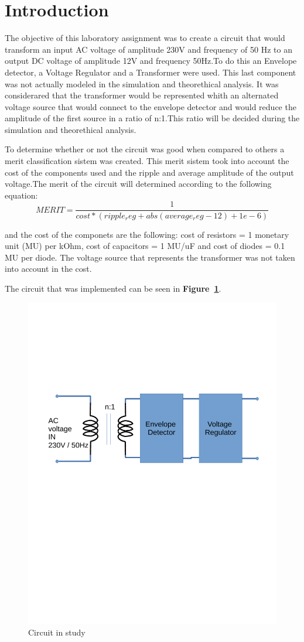 \section{Introduction}
\label{sec:introduction}


\par The objective of this laboratory assignment was to create a circuit that would transform an input AC voltage of amplitude 230V and frequency of 50 Hz to an output DC voltage of amplitude 12V and frequency 50Hz.To do this an Envelope detector, a Voltage Regulator and a Transformer were used. This last component was not actually modeled in the simulation and theorethical analysis. It was considerared that the transformer would be represented whith an alternated voltage source that would connect to the envelope detector and would reduce the amplitude of the first source in a ratio of n:1.This ratio will be decided during the simulation and theorethical analysis.\par
To determine whether or not the circuit was good when compared to others a merit classification sistem was created. This merit sistem took into account the cost of the components used and the ripple and average amplitude of the output voltage.The merit of the circuit will determined according to the following equation: 
\begin {equation}
	MERIT = \dfrac{1}{cost*(ripple_reg + abs(average_reg - 12) + 1e-6)}	
	\label{eq:i1}
\end{equation}

and the cost of the componets are the following: cost of resistors = 1 monetary unit (MU) per kOhm, cost of capacitors = 1 MU/uF
and cost of diodes = 0.1 MU per diode. The voltage source that represents the transformer was not taken into account in the cost. 
 
The circuit that was implemented can be seen in \textbf{Figure~\ref{fig:circuit_t3}}.\par
\begin{figure}[h] \centering
\includegraphics[width=0.4\linewidth]{circuit_t3.pdf}
\caption{Circuit in study}
\label{fig:circuit_t3}
\end{figure}


